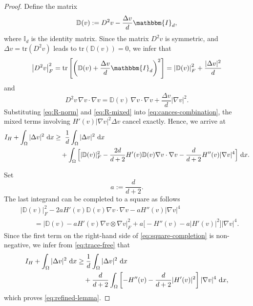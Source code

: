 \documentclass[11pt,  reqno]{amsart}%
\theoremstyle{plain}
\theoremstyle{definition}
\theoremstyle{remark}
\numberwithin{equation}{section}
\newcommand{\ve}{\varepsilon}
\newcommand{\dx}{\textup{d}x}
\begin{document}
\begin{proof}
Define the matrix
\[
    \mathbb{D}(v)
    :=
    D^2v-\frac{\Delta v}{d}\mathbbm{I}_d,
\]
where $\mathbb{I}_d$ is the identity matrix.
Since the matrix $D^2 v$ is symmetric,
and 
$\Delta v= \textrm{tr}(D^2 v)$ leads to $\textrm{tr}\left(  \mathbb{D}(v) \right)=0$, we infer that
\begin{equation}
\label{eq:R-norm}
\left|D^2 v \right|_F^2
= \textrm{tr}\left[ \left(  \mathbb{D}(v)  +\dfrac{\Delta v}{d} \mathbbm{I}_d\right)^2\right]
= \left|  \mathbb{D}(v)  \right|_F^2+\dfrac{|\Delta v|^2}{d}
\end{equation}
and
\begin{equation}
\label{eq:R-mixed}
    D^2v\,\nabla v \cdot \nabla v
    =
  \mathbb{D}(v) \, \nabla v \cdot \nabla v
    +
    \frac{\Delta v}{d}|\nabla v|^2.
\end{equation}
Substituting \eqref{eq:R-norm} and \eqref{eq:R-mixed} into
\eqref{eq:cances-combination}, the mixed terms involving
$H'(v)|\nabla v|^2\Delta v$ cancel exactly. Hence, we arrive at
\begin{align}
    I_H+\int_\Omega|\Delta v|^2\ \dx
    & \geq \
    \frac1d \int_\Omega|\Delta v|^2\ \dx
    \nonumber\\
    &\quad +
    \int_\Omega
    \Big[
        | \mathbb{D}(v) |_F^2
        -
        \frac{2d}{d+2}
        H'(v)   \mathbb{D}(v) \nabla v \cdot \nabla v
        -
        \frac{d}{d+2}
        H''(v)|\nabla v|^4
    \Big]\ \dx.
\label{eq:trace-free}
\end{align}

Set
\[
    a:=\frac{d}{d+2}.
\]
The last integrand can be completed to a square as follows
\begin{align}
    &| \mathbb{D}(v) |_F^2
    -
    2a H'(v)  \mathbb{D}(v) \nabla v \cdot \nabla v
    -
    aH''(v)|\nabla v|^4
    \nonumber\\
    &\qquad=
    \left|
         \mathbb{D}(v) -aH'(v)\nabla v\otimes\nabla v
    \right|_F^2
    +
    a
    \Big[
        -H''(v)-a|H'(v)|^2
    \Big]
    |\nabla v|^4.
\label{eq:square-completion}
\end{align}
Since the first term on the right-hand side of
\eqref{eq:square-completion} is non-negative, we infer from
\eqref{eq:trace-free} that
\begin{align}
    I_H+\int_\Omega|\Delta v|^2\ \dx
    &\geq
    \frac1d \int_\Omega|\Delta v|^2\ \dx
    \nonumber\\
    &\quad 
    +
    \frac{d}{d+2}
    \int_\Omega
    \left[
        -H''(v)
        -
        \frac{d}{d+2}|H'(v)|^2
    \right]
    |\nabla v|^4\ \dx,
\end{align}
which proves \eqref{eq:refined-lemma}.
\end{proof}
\end{document}
